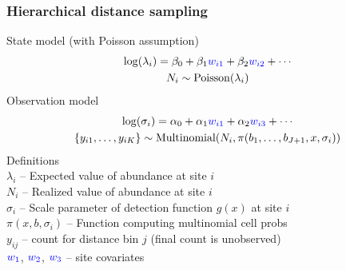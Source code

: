 \documentclass[color=usenames,dvipsnames]{beamer}\usepackage[]{graphicx}\usepackage[]{color}
\begin{document}
\begin{frame}
  \frametitle{Hierarchical distance sampling}
  \small
  State model (with Poisson assumption)
  \begin{gather*}
    \mathrm{log}(\lambda_i) = \beta_0 + \beta_1 {\color{blue} w_{i1}} +
    \beta_2 {\color{blue} w_{i2}} + \cdots \\
    N_i \sim \mathrm{Poisson}(\lambda_i)
  \end{gather*}
  \pause
  Observation model
  \begin{gather*}
    \mathrm{log}(\sigma_{i}) = \alpha_0 + \alpha_1 {\color{blue} w_{i1}}
    + \alpha_2 {\color{blue} w_{i3}} + \cdots \\
    \{y_{i1}, \dots, y_{iK}\}  \sim \mathrm{Multinomial}(N_i,
    \pi(b_1, \dots, b_{J+1}, x, \sigma_i))
  \end{gather*}
  \pause
  \small
  Definitions \\
  $\lambda_i$ -- Expected value of abundance at site $i$ \\
  $N_i$ -- Realized value of abundance at site $i$ \\
  $\sigma_{i}$ -- Scale parameter of detection function $g(x)$ at site $i$ \\
  $\pi(x,b,\sigma_i)$ -- Function computing multinomial cell probs \\
  $y_{ij}$ -- count for distance bin $j$ (final count is unobserved) \\
  $\color{blue} w_1$, $\color{blue} w_2$, $\color{blue} w_3$ -- site covariates %
\end{frame}
\end{document}
